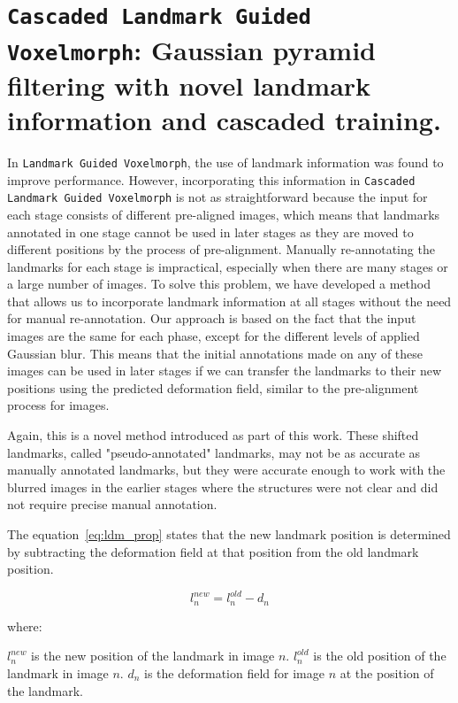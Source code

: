 \documentclass{book}
\begin{document}
	\section{\texttt{Cascaded Landmark Guided Voxelmorph}: Gaussian pyramid filtering with novel landmark information and cascaded training.}
	In \texttt{Landmark Guided Voxelmorph}, the use of landmark information was found to improve performance. However, incorporating this information in \texttt{Cascaded Landmark Guided Voxelmorph} is not as straightforward because the input for each stage consists of different pre-aligned images, which means that landmarks annotated in one stage cannot be used in later stages as they are moved to different positions by the process of pre-alignment. Manually re-annotating the landmarks for each stage is impractical, especially when there are many stages or a large number of images. To solve this problem, we have developed a method that allows us to incorporate landmark information at all stages without the need for manual re-annotation. Our approach is based on the fact that the input images are the same for each phase, except for the different levels of applied Gaussian blur. This means that the initial annotations made on any of these images can be used in later stages if we can transfer the landmarks to their new positions using the predicted deformation field, similar to the pre-alignment process for images.
	
	Again, this is a novel method introduced as part of this work. These shifted landmarks, called "pseudo-annotated" landmarks, may not be as accurate as manually annotated landmarks, but they were accurate enough to work with the blurred images in the earlier stages where the structures were not clear and did not require precise manual annotation.
	
	The equation~\ref{eq:ldm_prop} states that the new landmark position is determined by subtracting the deformation field at that position from the old landmark position.
	
	\begin{equation}\label{eq:ldm_prop}
		l_n^{new} = l_n^{old} - d_n
	\end{equation}
	
	where:
	
	$l_n^{new}$ is the new position of the landmark in image $n$. $l_n^{old}$ is the old position of the landmark in image $n$. $d_n$ is the deformation field for image $n$ at the position of the landmark.
	
\end{document}
